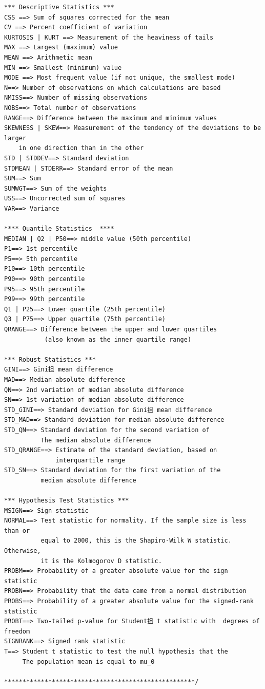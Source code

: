 \documentclass[
]{book}
\begin{document}
\begin{verbatim}
*** Descriptive Statistics ***
CSS ==> Sum of squares corrected for the mean
CV ==> Percent coefficient of variation
KURTOSIS | KURT ==> Measurement of the heaviness of tails
MAX ==> Largest (maximum) value
MEAN ==> Arithmetic mean
MIN ==> Smallest (minimum) value
MODE ==> Most frequent value (if not unique, the smallest mode)
N==> Number of observations on which calculations are based
NMISS==> Number of missing observations
NOBS==> Total number of observations
RANGE==> Difference between the maximum and minimum values
SKEWNESS | SKEW==> Measurement of the tendency of the deviations to be larger 
    in one direction than in the other
STD | STDDEV==> Standard deviation
STDMEAN | STDERR==> Standard error of the mean
SUM==> Sum
SUMWGT==> Sum of the weights
USS==> Uncorrected sum of squares
VAR==> Variance

**** Quantile Statistics  ****
MEDIAN | Q2 | P50==> middle value (50th percentile)
P1==> 1st percentile
P5==> 5th percentile
P10==> 10th percentile
P90==> 90th percentile
P95==> 95th percentile
P99==> 99th percentile
Q1 | P25==> Lower quartile (25th percentile)
Q3 | P75==> Upper quartile (75th percentile)
QRANGE==> Difference between the upper and lower quartiles 
           (also known as the inner quartile range)

*** Robust Statistics ***
GINI==> Gini抯 mean difference
MAD==> Median absolute difference
QN==> 2nd variation of median absolute difference
SN==> 1st variation of median absolute difference
STD_GINI==> Standard deviation for Gini抯 mean difference
STD_MAD==> Standard deviation for median absolute difference
STD_QN==> Standard deviation for the second variation of 
          The median absolute difference
STD_QRANGE==> Estimate of the standard deviation, based on 
              interquartile range
STD_SN==> Standard deviation for the first variation of the 
          median absolute difference

*** Hypothesis Test Statistics ***
MSIGN==> Sign statistic
NORMAL==> Test statistic for normality. If the sample size is less than or 
          equal to 2000, this is the Shapiro-Wilk W statistic. Otherwise, 
          it is the Kolmogorov D statistic.
PROBM==> Probability of a greater absolute value for the sign statistic
PROBN==> Probability that the data came from a normal distribution
PROBS==> Probability of a greater absolute value for the signed-rank statistic
PROBT==> Two-tailed p-value for Student抯 t statistic with  degrees of freedom
SIGNRANK==> Signed rank statistic
T==> Student t statistic to test the null hypothesis that the
     The population mean is equal to mu_0 

****************************************************/
\end{verbatim}
\end{document}

